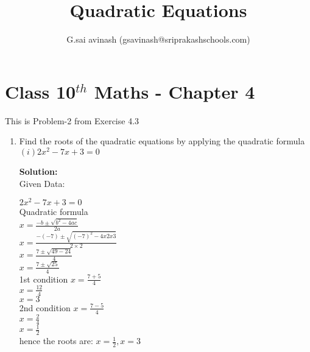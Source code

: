 \documentclass[12pt]{article}
\title{Quadratic Equations}
\author{G.sai avinash (gsavinash@sriprakashschools.com)}
\newcommand{\solution}{\noindent \textbf{Solution: }}
\begin{document}
\maketitle
\section*{Class 10$^{th}$ Maths - Chapter 4}
This is Problem-2 from Exercise 4.3
\begin{enumerate}
\item   Find the roots of the quadratic equations by applying the quadratic formula \\

${(i)2{x^2} - 7x + 3 = 0}$


\solution \\
Given Data:

${2x^2- 7x + 3 = 0}$\\
Quadratic formula\\

$x=\frac{-b\pm\sqrt{b^2-4ac}}{2a}$\\
$x=\frac{-(-7)\pm\sqrt{(-7)^2-4x2x3 }}{2 \times 2}$\\
$x=\frac{7\pm\sqrt{49 - 24}}{4}$\\
$x=\frac{7\pm\sqrt{25}}{4}$\\


1st condition
$x=\frac{7+5}{4}$\\
$x=\frac{12}{4}$\\
$x=3$\\

2nd condition
$x=\frac{7-5}{4}$\\
$x=\frac{2}{4}$\\
$x=\frac{1}{2}$\\


hence the roots are: ${x=\frac{1}{2}}{, x=3}$\\









\end{enumerate}
\end{document}
